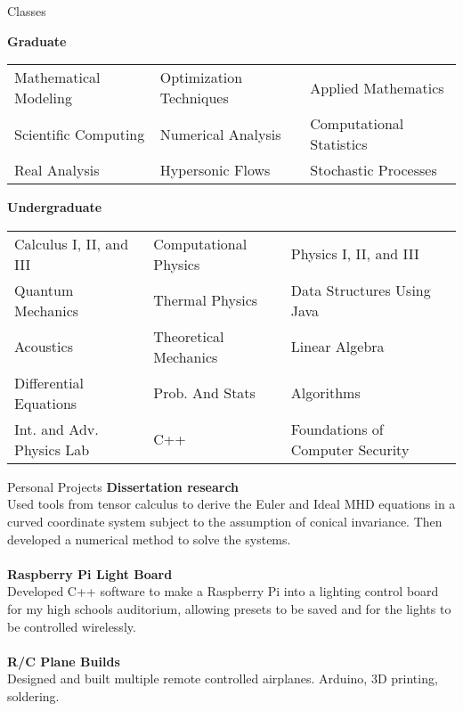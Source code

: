 \documentclass{resume} %
\begin{document}
\begin{rSection}{Classes}

{\bf Graduate}\\
\begin{tabular}{ m{15em} m{15em} m{15em} }
Mathematical Modeling & Optimization Techniques	& Applied Mathematics \\
Scientific Computing & Numerical Analysis & Computational Statistics \\
Real Analysis & Hypersonic Flows & Stochastic Processes\\
\end{tabular}

{\bf Undergraduate}\\
\begin{tabular}{ m{15em} m{15em} m{15em} }
Calculus I, II, and III & Computational Physics & Physics I, II, and III \\
Quantum Mechanics & Thermal Physics & Data Structures Using Java \\
Acoustics & Theoretical Mechanics & Linear Algebra \\
Differential Equations & Prob. And Stats & Algorithms \\
Int. and Adv. Physics Lab  & C++ & Foundations of Computer Security
\end{tabular}

\end{rSection}



\begin{rSection}{Personal Projects}
{\bf Dissertation research}
\\Used tools from tensor calculus to derive the Euler and Ideal MHD equations in a curved coordinate system
subject to the assumption of conical invariance. Then developed a numerical method to solve the systems. \\
\\{\bf Raspberry Pi Light Board}\\
Developed C++ software to make a Raspberry Pi into a lighting control board for my high school\textquotesingle s auditorium,
allowing presets to be saved and for the lights to be controlled wirelessly.\\
\\{\bf R/C Plane Builds}\\
Designed and built multiple remote controlled airplanes. Arduino, 3D printing, soldering.



\end{rSection}
\end{document}
